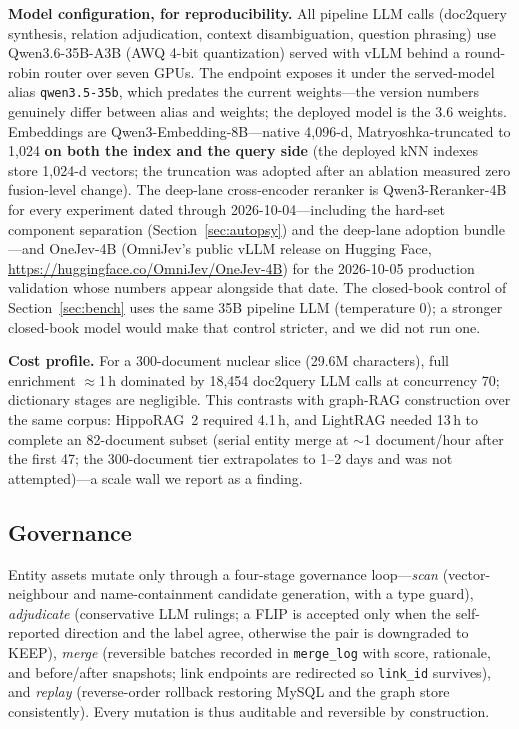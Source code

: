 \documentclass[sigconf,nonacm]{acmart}
\begin{document}
\textbf{Model configuration, for reproducibility.} All pipeline LLM calls
(doc2query synthesis, relation adjudication, context disambiguation,
question phrasing) use Qwen3.6-35B-A3B (AWQ 4-bit quantization) served
with vLLM behind a round-robin router over seven GPUs. The endpoint
exposes it under the served-model alias \texttt{qwen3.5-35b}, which
predates the current weights---the version numbers genuinely differ
between alias and weights; the deployed model is the 3.6 weights.
Embeddings are Qwen3-Embedding-8B---native 4{,}096-d,
Matryoshka-truncated to 1{,}024 \textbf{on both the index and the query
side} (the deployed kNN indexes store 1{,}024-d vectors; the truncation
was adopted after an ablation measured zero fusion-level change). The
deep-lane cross-encoder reranker is Qwen3-Reranker-4B for every
experiment dated through 2026-10-04---including the hard-set component
separation (Section~\ref{sec:autopsy}) and the deep-lane adoption
bundle---and OneJev-4B (OmniJev's public vLLM release on Hugging Face,
\url{https://huggingface.co/OmniJev/OneJev-4B})
for the 2026-10-05 production validation whose numbers appear alongside
that date. The closed-book control of Section~\ref{sec:bench} uses the
same 35B pipeline LLM (temperature 0); a stronger closed-book model would
make that control stricter, and we did not run one.

\textbf{Cost profile.} For a 300-document nuclear slice (29.6M characters),
full enrichment ${\approx}$1\,h dominated by 18{,}454 doc2query LLM calls at
concurrency 70; dictionary stages are negligible. This contrasts with
graph-RAG construction over the same corpus: HippoRAG~2 required 4.1\,h, and
LightRAG needed 13\,h to complete an 82-document subset (serial entity
merge at ${\sim}$1 document/hour after the first 47; the 300-document tier
extrapolates to 1--2 days and was not attempted)---a scale wall we report
as a finding.

\subsection{Governance}

Entity assets mutate only through a four-stage governance loop---\emph{scan}
(vector-neighbour and name-containment candidate generation, with a type
guard), \emph{adjudicate} (conservative LLM rulings; a FLIP is accepted only
when the self-reported direction and the label agree, otherwise the pair is
downgraded to KEEP), \emph{merge} (reversible batches recorded in
\texttt{merge\_log} with score, rationale, and before/after snapshots; link
endpoints are redirected so \texttt{link\_id} survives), and \emph{replay}
(reverse-order rollback restoring MySQL and the graph store consistently).
Every mutation is thus auditable and reversible by construction.
\end{document}
